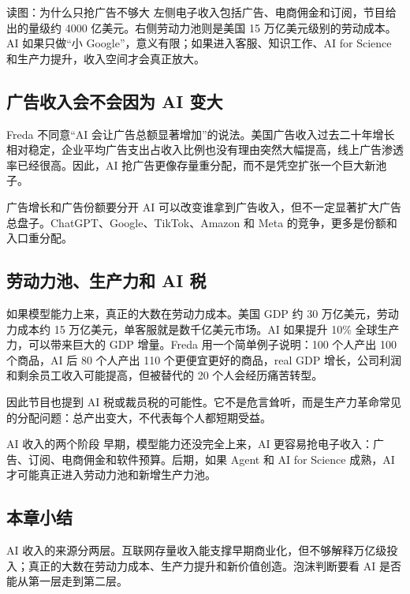 \documentclass[a4paper]{article}
\begin{document}
\begin{knowledgebox}{读图：为什么只抢广告不够大}
左侧电子收入包括广告、电商佣金和订阅，节目给出的量级约 4000 亿美元。右侧劳动力池则是美国 15 万亿美元级别的劳动成本。AI 如果只做“小 Google”，意义有限；如果进入客服、知识工作、AI for Science 和生产力提升，收入空间才会真正放大。
\end{knowledgebox}

\subsection{广告收入会不会因为 AI 变大}

Freda 不同意“AI 会让广告总额显著增加”的说法。美国广告收入过去二十年增长相对稳定，企业平均广告支出占收入比例也没有理由突然大幅提高，线上广告渗透率已经很高。因此，AI 抢广告更像存量重分配，而不是凭空扩张一个巨大新池子。

\begin{warningbox}{广告增长和广告份额要分开}
AI 可以改变谁拿到广告收入，但不一定显著扩大广告总盘子。ChatGPT、Google、TikTok、Amazon 和 Meta 的竞争，更多是份额和入口重分配。
\end{warningbox}

\subsection{劳动力池、生产力和 AI 税}

如果模型能力上来，真正的大数在劳动力成本。美国 GDP 约 30 万亿美元，劳动力成本约 15 万亿美元，单客服就是数千亿美元市场。AI 如果提升 10\% 全球生产力，可以带来巨大的 GDP 增量。Freda 用一个简单例子说明：100 个人产出 100 个商品，AI 后 80 个人产出 110 个更便宜更好的商品，real GDP 增长，公司利润和剩余员工收入可能提高，但被替代的 20 个人会经历痛苦转型。

因此节目也提到 AI 税或裁员税的可能性。它不是危言耸听，而是生产力革命常见的分配问题：总产出变大，不代表每个人都短期受益。

\begin{importantbox}{AI 收入的两个阶段}
早期，模型能力还没完全上来，AI 更容易抢电子收入：广告、订阅、电商佣金和软件预算。后期，如果 Agent 和 AI for Science 成熟，AI 才可能真正进入劳动力池和新增生产力池。
\end{importantbox}

\subsection{本章小结}

AI 收入的来源分两层。互联网存量收入能支撑早期商业化，但不够解释万亿级投入；真正的大数在劳动力成本、生产力提升和新价值创造。泡沫判断要看 AI 是否能从第一层走到第二层。
\end{document}
